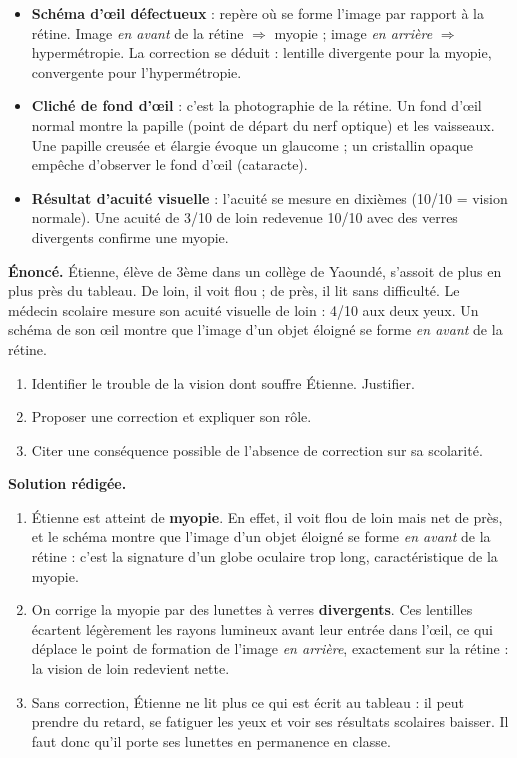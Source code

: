 \documentclass[11pt]{article}
\begin{document}
\begin{itemize}
\item \textbf{Schéma d'œil défectueux} : repère où se forme l'image par rapport à la rétine. Image \emph{en avant} de la rétine $\Rightarrow$ myopie ; image \emph{en arrière} $\Rightarrow$ hypermétropie. La correction se déduit : lentille divergente pour la myopie, convergente pour l'hypermétropie.
\item \textbf{Cliché de fond d'œil} : c'est la photographie de la rétine. Un fond d'œil normal montre la papille (point de départ du nerf optique) et les vaisseaux. Une papille creusée et élargie évoque un glaucome ; un cristallin opaque empêche d'observer le fond d'œil (cataracte).
\item \textbf{Résultat d'acuité visuelle} : l'acuité se mesure en dixièmes (10/10 = vision normale). Une acuité de 3/10 de loin redevenue 10/10 avec des verres divergents confirme une myopie.
\end{itemize}

\begin{exoresolu}
\textbf{Énoncé.} Étienne, élève de 3ème dans un collège de Yaoundé, s'assoit de plus en plus près du tableau. De loin, il voit flou ; de près, il lit sans difficulté. Le médecin scolaire mesure son acuité visuelle de loin : 4/10 aux deux yeux. Un schéma de son œil montre que l'image d'un objet éloigné se forme \emph{en avant} de la rétine.
\begin{enumerate}
\item Identifier le trouble de la vision dont souffre Étienne. Justifier.
\item Proposer une correction et expliquer son rôle.
\item Citer une conséquence possible de l'absence de correction sur sa scolarité.
\end{enumerate}
\tcblower
\textbf{Solution rédigée.}
\begin{enumerate}
\item Étienne est atteint de \textbf{myopie}. En effet, il voit flou de loin mais net de près, et le schéma montre que l'image d'un objet éloigné se forme \emph{en avant} de la rétine : c'est la signature d'un globe oculaire trop long, caractéristique de la myopie.
\item On corrige la myopie par des lunettes à verres \textbf{divergents}. Ces lentilles écartent légèrement les rayons lumineux avant leur entrée dans l'œil, ce qui déplace le point de formation de l'image \emph{en arrière}, exactement sur la rétine : la vision de loin redevient nette.
\item Sans correction, Étienne ne lit plus ce qui est écrit au tableau : il peut prendre du retard, se fatiguer les yeux et voir ses résultats scolaires baisser. Il faut donc qu'il porte ses lunettes en permanence en classe.
\end{enumerate}
\end{exoresolu}
\end{document}
